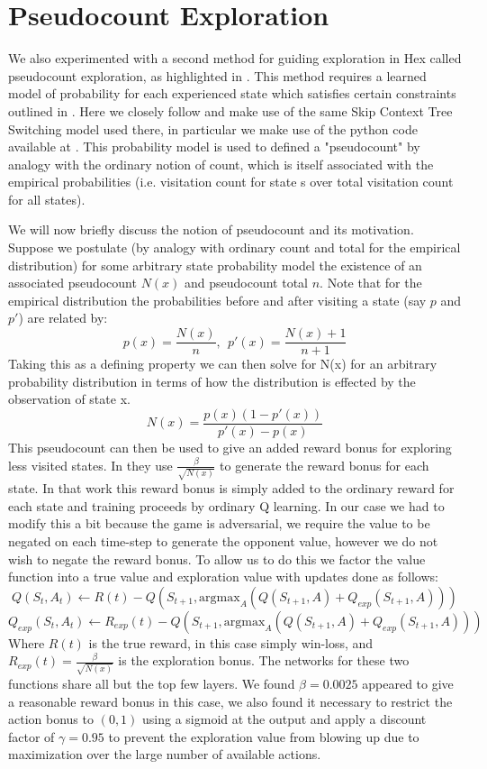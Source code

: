 \documentclass{article}
\begin{document}
\section*{Pseudocount Exploration}
We also experimented with a second method for guiding exploration in Hex called pseudocount exploration, as highlighted in \cite{pseudocounts}. This method requires a learned model of probability for each experienced state which satisfies certain constraints outlined in \cite{pseudocounts}. Here we closely follow \cite{pseudocounts} and make use of the same Skip Context Tree Switching \cite{SCTS} model used there, in particular we make use of the python code available at \cite{SCTS_code}. This probability model is used to defined a "pseudocount" by analogy with the ordinary notion of count, which is itself associated with the empirical probabilities (i.e. visitation count for state s over total visitation count for all states).

We will now briefly discuss the notion of pseudocount and its motivation. Suppose we postulate (by analogy with ordinary count and total for the empirical distribution) for some arbitrary state probability model the existence of an associated pseudocount $N(x)$ and pseudocount total $n$. Note that for the empirical distribution the probabilities before and after visiting a state (say $p$ and $p'$) are related by:
$$p(x)=\frac{N(x)}{n},\ \ p'(x)=\frac{N(x)+1}{n+1}$$
Taking this as a defining property we can then solve for N(x) for an arbitrary probability distribution in terms of how the distribution is effected by the observation of state x.
$$N(x)=\frac{p(x)(1-p'(x))}{p'(x)-p(x)}$$
This pseudocount can then be used to give an added reward bonus for exploring less visited states. In \cite{pseudocounts} they use $\frac{\beta}{\sqrt{N(x)}}$ to generate the reward bonus for each state. In that work this reward bonus is simply added to the ordinary reward for each state and training proceeds by ordinary Q learning. In our case we had to modify this a bit because the game is adversarial, we require the value to be negated on each time-step to generate the opponent value, however we do not wish to negate the reward bonus. To allow us to do this we factor the value function into a true value and exploration value with updates done as follows:
$$Q(S_t,A_t) \leftarrow R(t) - Q(S_{t+1}, \text{argmax}_A(Q(S_{t+1}, A)+Q_{exp}(S_{t+1},A)))$$
$$Q_{exp}(S_t,A_t) \leftarrow R_{exp}(t) - Q(S_{t+1}, \text{argmax}_A(Q(S_{t+1}, A)+Q_{exp}(S_{t+1},A)))$$
Where $R(t)$ is the true reward, in this case simply win-loss, and $R_{exp}(t)=\frac{\beta}{\sqrt{N(x)}}$ is the exploration bonus. The networks for these two functions share all but the top few layers. We found $\beta=0.0025$ appeared to give a reasonable reward bonus in this case, we also found it necessary to restrict the action bonus to $(0,1)$ using a sigmoid at the output and apply a discount factor of $\gamma=0.95$ to prevent the exploration value from blowing up due to maximization over the large number of available actions.
\end{document}
